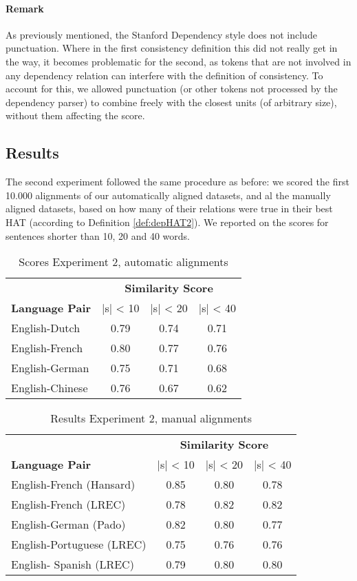 \documentclass[hidelinks]{report}
\begin{document}
\paragraph{Remark} As previously mentioned, the Stanford Dependency style does not include punctuation. Where in the first consistency definition this did not really get in the way, it becomes problematic for the second, as tokens that are not involved in any dependency relation can interfere with the definition of consistency. To account for this, we allowed punctuation (or other tokens not processed by the dependency parser) to combine freely with the closest units (of arbitrary size), without them affecting the score.

\subsection{Results}

The second experiment followed the same procedure as before: we scored the first 10.000 alignments of our automatically aligned datasets, and al the manually aligned datasets, based on how many of their relations were true in their best HAT (according to Definition \ref{def:depHAT2}). We reported on the scores for sentences shorter than 10, 20 and 40 words.

\begin{table}[!ht]
\centering
\begin{tabular}{|l|c|c|c|}
\hline
&\multicolumn{3}{c|}{\textbf{Similarity Score}}\\
\textbf{Language Pair} & |s| < 10 & |s| < 20 & |s| < 40\\
\hline \hline
English-Dutch & 0.79 & 0.74 & 0.71 \\
\hline
English-French & 0.80 & 0.77 & 0.76\\
\hline
English-German & 0.75 & 0.71 & 0.68 \\
\hline
English-Chinese & 0.76 & 0.67 & 0.62\\
\hline
\end{tabular}
\caption{Scores Experiment 2, automatic alignments}\label{tab:scores3}
\end{table}

\begin{table}[!ht]
\centering
\begin{tabular}{|l|c|c|c|}
\hline
&\multicolumn{3}{c|}{\textbf{Similarity Score}}\\
\textbf{Language Pair} & |s| < 10 & |s| < 20 & |s| < 40\\
\hline \hline
English-French (Hansard) & 0.85 & 0.80 & 0.78 \\
\hline
English-French (LREC) & 0.78 & 0.82 & 0.82 \\
\hline
English-German (Pado) & 0.82 & 0.80 & 0.77 \\
\hline
English-Portuguese (LREC) & 0.75 & 0.76 & 0.76 \\
\hline
English- Spanish (LREC) & 0.79 & 0.80 & 0.80\\
\hline
\end{tabular}
\caption{Results Experiment 2, manual alignments}\label{tab:scores4}
\end{table}
\end{document}
